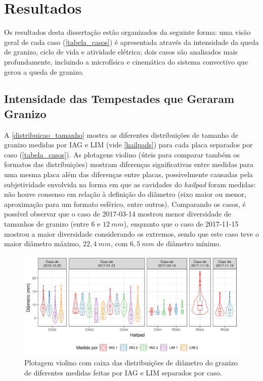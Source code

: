 \chapter{Resultados}\label{resultados}

Os resultados desta dissertação estão organizados da seguinte forma: uma visão geral de cada caso (\autoref{tabela_casos}) é apresentada através da intensidade da queda de granizo, ciclo de vida e atividade elétrica; dois casos são analisados mais profundamente, incluindo a microfísica e cinemática do sistema convectivo que gerou a queda de granizo.

\section{Intensidade das Tempestades que Geraram Granizo}\label{ciclo_vida}

A \autoref{distribuicao_tamanho} mostra as diferentes distribuições de tamanho de granizo medidas por IAG e LIM (vide \autoref{hailpads}) para cada placa separados por caso (\autoref{tabela_casos}). As plotagens violino (úteis para comparar também os formatos das distribuições) mostram diferenças significativas entre medidas para uma mesma placa além das diferenças entre placas, possivelmente causadas pela subjetividade envolvida na forma em que as cavidades do \textit{hailpad} foram medidas: não houve consenso em relação à definição do diâmetro (eixo maior ou menor, aproximação para um formato esférico, entre outros). Comparando os casos, é possível observar que o caso de 2017-03-14 mostrou menor diversidade de tamanhos de granizo (entre $6$ e $12\:mm$), enquanto que o caso de 2017-11-15 mostrou a maior diversidade considerando os extremos, sendo que este caso teve o maior diâmetro máximo, $22,4\:mm$, com $6,5\:mm$ de diâmetro mínimo.

\begin{figure}[htb]
	\begin{center}
		\caption{Plotagem violino com caixa das distribuições de diâmetro do granizo de diferentes medidas feitas por IAG e LIM separados por caso.} 
		\label{distribuicao_tamanho}
		\includegraphics[width=\columnwidth]{../Hailpads_Processing/figures/measures_distribution_ptbr.png}
	\end{center}
\end{figure}

